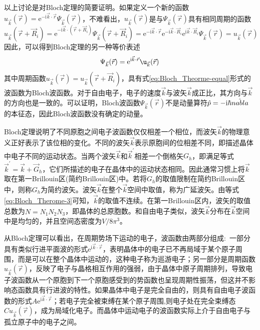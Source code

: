 以上讨论是对Bloch定理的简要证明。如果定义一个新的函数$u_{\vec k}(\vec r)=\mathrm{e}^{-\mathrm{i}\vec k\cdot\vec r}\Psi_{\vec k}(\vec r)$，不难看出，$u_{\vec k}(\vec r)$是与$\Psi_{\vec k}(\vec r)$具有相同周期的函数
\begin{displaymath}
	u_{\vec k}(\vec r+\vec R_i)=\mathrm{e}^{-\mathrm{i}\vec k\cdot(\vec r+\vec R_i)}\Psi_{\vec k}(\vec r+\vec R_i)=\mathrm{e}^{-\mathrm{i}\vec k\cdot\vec r}\mathrm{e}^{-\mathrm{i}\vec k\cdot\vec R_i}\mathrm{e}^{\mathrm{i}\vec k\cdot\vec R_i}\Psi_{\vec k}(\vec r)=u_{\vec k}(\vec r)
\end{displaymath}
因此，可以得到Bloch定理的另一种等价表述
\begin{equation}
	\Psi_{\vec k}(\vec r)=\mathrm{e}^{\mathrm{i}\vec k\cdot\vec r}\u_{\vec k}(\vec r)
	\label{eq:Bloch_Theorme-equal}
\end{equation}
其中周期函数$u_{\vec k}(\vec r)=u_{\vec k}(\vec r+\vec R_i)$，具有式\eqref{eq:Bloch_Theorme-equal}形式的波函数为Bloch波函数。对于自由电子，电子的速度$\vec k$与波矢$\vec k$成正比，其方向与$\vec k$的方向也是一致的。可以证明，Bloch波函数$\Psi_{\vec k}(\vec r)$不是动量算符$\hat p=-\mathrm{i}\hbar\hat{\\nabla}$的本征态，因此Bloch波函数没有确定的动量。

Bloch定理说明了不同原胞之间电子波函数仅仅相差一个相位，而波矢$\vec k$的物理意义正好表示了该位相的变化。不同的波矢$\vec k$表示原胞间的位相差不同，即描述晶体中电子不同的运动状态。当两个波矢$\vec k$和$\vec k^{\prime}$相差一个倒格矢$G_h$，即满足等式$\vec k^{\prime}=\vec k+\vec G_h$，它们所描述的电子在晶体中的运动状态相同。因此通常习惯上将$\vec k$取在第一Brillouin区(简约Brillouin区)中。若将$G_h$的取值限制在简约Brillouin区中，则称$G_h$为简约波矢。波矢$\vec k$在整个$\vec k$空间中取值，称为广延波矢。由等式\eqref{eq:Bloch_Therome-3}可知，$\vec k$的取值不连续。在第一Brillouin区内，波矢的取值总数为$N=N_1N_2N_3$，即晶体的总原胞数。和自由电子类似，波矢$\vec k$分布在$\vec k$空间中是均匀的，并且空间态密度为$V/8\pi^3$。

从Bloch定理可以看出，在周期势场下运动的电子，波函数由两部分组成:~一部分具有类似行进平面波的形式$\mathrm{e}^{\mathrm{i}\vec k\cdot\vec r}$，表明晶体中的电子已不再局域于某个原子周围，而是可以在整个晶体中运动的，这种电子称为巡游电子；另一部分是周期函数$u_{\vec k}(\vec r)$，反映了电子与晶格相互作用的强弱，由于晶体中原子周期排列，导致电子波函数从一个原胞到下一个原胞感受到的势函数也呈现周期性振荡，但这并不影响态函数具有行进波的特性。如果晶体中电子是完全自由的，则具有自由电子波函数的形式$A\mathrm{e}^{\mathrm{i}\vec k\cdot\vec r}$；若电子完全被束缚在某个原子周围,则电子处在完全束缚态$Cu_{\vec k}(\vec r)$，成为局域化电子。而晶体中运动电子的波函数实际上介于自由电子与孤立原子中的电子之间。

